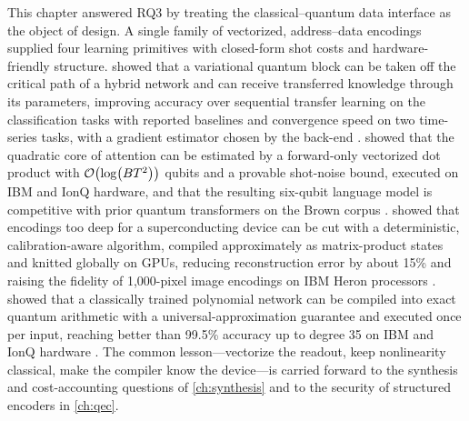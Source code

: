 This chapter answered RQ3 by treating the classical--quantum data interface as the object of design. A single family of vectorized, address--data encodings supplied four learning primitives with closed-form shot costs and hardware-friendly structure. \qpie{} showed that a variational quantum block can be taken off the critical path of a hybrid network and can receive transferred knowledge through its parameters, improving accuracy over sequential transfer learning on the classification tasks with reported baselines and convergence speed on two time-series tasks, with a gradient estimator chosen by the back-end \cite{guo2025qpie}. \vqt{} showed that the quadratic core of attention can be estimated by a forward-only vectorized dot product with $\mathcal{O}\!\left(\log(BT^2)\right)$ qubits and a provable shot-noise bound, executed on IBM and IonQ hardware, and that the resulting six-qubit language model is competitive with prior quantum transformers on the Brown corpus \cite{guo2025vqt}. \shardq{} showed that encodings too deep for a superconducting device can be cut with a deterministic, calibration-aware algorithm, compiled approximately as matrix-product states and knitted globally on GPUs, reducing reconstruction error by about 15\% and raising the fidelity of 1,000-pixel image encodings on IBM Heron processors \cite{guo2025shardq}. \nnqa{} showed that a classically trained polynomial network can be compiled into exact quantum arithmetic with a universal-approximation guarantee and executed once per input, reaching better than 99.5\% accuracy up to degree 35 on IBM and IonQ hardware \cite{guo2026nnqa}. The common lesson---vectorize the readout, keep nonlinearity classical, make the compiler know the device---is carried forward to the synthesis and cost-accounting questions of \cref{ch:synthesis} and to the security of structured encoders in \cref{ch:qec}.
